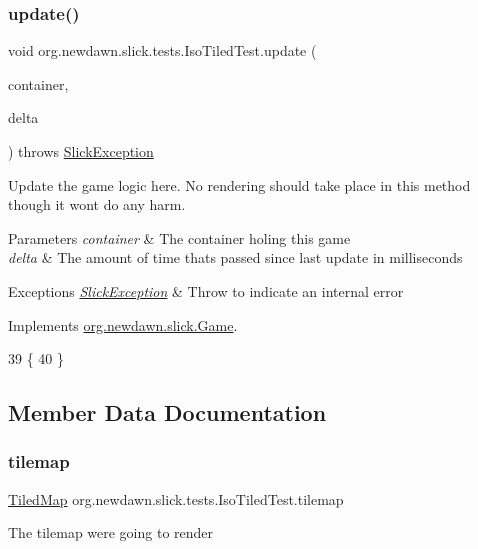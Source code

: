 \subsubsection{\texorpdfstring{update()}{update()}}
{\footnotesize\ttfamily void org.\+newdawn.\+slick.\+tests.\+Iso\+Tiled\+Test.\+update (\begin{DoxyParamCaption}\item[{\mbox{\hyperlink{classorg_1_1newdawn_1_1slick_1_1_game_container}{Game\+Container}}}]{container,  }\item[{int}]{delta }\end{DoxyParamCaption}) throws \mbox{\hyperlink{classorg_1_1newdawn_1_1slick_1_1_slick_exception}{Slick\+Exception}}\hspace{0.3cm}{\ttfamily [inline]}}

Update the game logic here. No rendering should take place in this method though it won\textquotesingle{}t do any harm.


\begin{DoxyParams}{Parameters}
{\em container} & The container holing this game \\
\hline
{\em delta} & The amount of time thats passed since last update in milliseconds \\
\hline
\end{DoxyParams}

\begin{DoxyExceptions}{Exceptions}
{\em \mbox{\hyperlink{classorg_1_1newdawn_1_1slick_1_1_slick_exception}{Slick\+Exception}}} & Throw to indicate an internal error \\
\hline
\end{DoxyExceptions}


Implements \mbox{\hyperlink{interfaceorg_1_1newdawn_1_1slick_1_1_game_ab07b2e9463ee4631620dde0de25bdee8}{org.\+newdawn.\+slick.\+Game}}.


\begin{DoxyCode}
39                                   \{
40     \}
\end{DoxyCode}


\subsection{Member Data Documentation}
\mbox{\label{classorg_1_1newdawn_1_1slick_1_1tests_1_1_iso_tiled_test_a50c678a4d5ae115e8b9c76363c127aab}} 
\subsubsection{\texorpdfstring{tilemap}{tilemap}}
{\footnotesize\ttfamily \mbox{\hyperlink{classorg_1_1newdawn_1_1slick_1_1tiled_1_1_tiled_map}{Tiled\+Map}} org.\+newdawn.\+slick.\+tests.\+Iso\+Tiled\+Test.\+tilemap\hspace{0.3cm}{\ttfamily [private]}}

The tilemap we\textquotesingle{}re going to render 